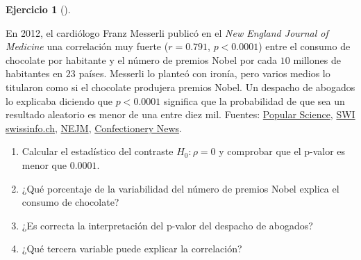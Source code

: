 \documentclass[
  spanish,
  a4paper,
]{scrreport}
\theoremstyle{definition}
\newtheorem{exercise}{Ejercicio}[chapter]
\theoremstyle{remark}
\begin{document}
\begin{exercise}[]\protect\hypertarget{exr-interpretacion-chocolate-nobel}{}\label{exr-interpretacion-chocolate-nobel}

En 2012, el cardiólogo Franz Messerli publicó en el \emph{New England
Journal of Medicine} una correlación muy fuerte (\(r=0.791\),
\(p<0.0001\)) entre el consumo de chocolate por habitante y el número de
premios Nobel por cada \(10\) millones de habitantes en \(23\) países.
Messerli lo planteó con ironía, pero varios medios lo titularon como si
el chocolate produjera premios Nobel. Un despacho de abogados lo
explicaba diciendo que \(p<0.0001\) significa que la probabilidad de que
sea un resultado aleatorio es menor de una entre diez mil. Fuentes:
\href{https://www.popsci.com/science/article/2012-10/nations-chocolate-intake-directly-correlated-number-nobel-laureates-it-spawns-not-really}{Popular
Science},
\href{https://www.swissinfo.ch/eng/sci-tech/does-chocolate-help-you-win-a-nobel-prize/33704568}{SWI
swissinfo.ch},
\href{https://blogs.nejm.org/cardioexchange/2012/10/10/chocolate-and-nobel-prizes-linked/}{NEJM},
\href{https://www.confectionerynews.com/Regulation-Safety/Eating-chocolate-produces-Nobel-prize-winners-says-study}{Confectionery
News}.

\begin{enumerate}
\def\labelenumi{\alph{enumi}.}
\item
  Calcular el estadístico del contraste \(H_0: \rho=0\) y comprobar que
  el p-valor es menor que \(0.0001\).
\item
  ¿Qué porcentaje de la variabilidad del número de premios Nobel explica
  el consumo de chocolate?
\item
  ¿Es correcta la interpretación del p-valor del despacho de abogados?
\item
  ¿Qué tercera variable puede explicar la correlación?
\end{enumerate}

\end{exercise}
\end{document}
